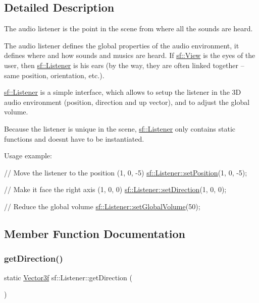 \subsection{Detailed Description}
The audio listener is the point in the scene from where all the sounds are heard. 

The audio listener defines the global properties of the audio environment, it defines where and how sounds and musics are heard. If \hyperlink{classsf_1_1_view}{sf\+::\+View} is the eyes of the user, then \hyperlink{classsf_1_1_listener}{sf\+::\+Listener} is his ears (by the way, they are often linked together -- same position, orientation, etc.).

\hyperlink{classsf_1_1_listener}{sf\+::\+Listener} is a simple interface, which allows to setup the listener in the 3D audio environment (position, direction and up vector), and to adjust the global volume.

Because the listener is unique in the scene, \hyperlink{classsf_1_1_listener}{sf\+::\+Listener} only contains static functions and doesn\textquotesingle{}t have to be instantiated.

Usage example\+: 
\begin{DoxyCode}
\textcolor{comment}{// Move the listener to the position (1, 0, -5)}
\hyperlink{classsf_1_1_listener_a5bc2d8d18ea2d8f339d23cbf17678564}{sf::Listener::setPosition}(1, 0, -5);

\textcolor{comment}{// Make it face the right axis (1, 0, 0)}
\hyperlink{classsf_1_1_listener_ae479dc15513c6557984d26e32d06d06e}{sf::Listener::setDirection}(1, 0, 0);

\textcolor{comment}{// Reduce the global volume}
\hyperlink{classsf_1_1_listener_a803a24a1fc04620cacc9f88c6fbc0e3a}{sf::Listener::setGlobalVolume}(50);
\end{DoxyCode}
 

\subsection{Member Function Documentation}
\mbox{\label{classsf_1_1_listener_a54e91baba51d4431474f53ff7f9309f9}} 
\subsubsection{\texorpdfstring{get\+Direction()}{getDirection()}}
{\footnotesize\ttfamily static \hyperlink{classsf_1_1_vector3}{Vector3f} sf\+::\+Listener\+::get\+Direction (\begin{DoxyParamCaption}{ }\end{DoxyParamCaption})\hspace{0.3cm}{\ttfamily [static]}}




